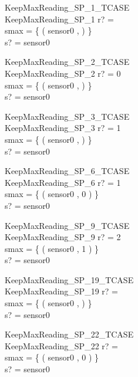 \begin{schema}{KeepMaxReading\_SP\_1\_TCASE}\\
 KeepMaxReading\_SP\_1 
\where
 r? =~ \\
 smax = \{ ( sensor0 ,  ) \} \\
 s? = sensor0
\end{schema}


\begin{schema}{KeepMaxReading\_SP\_2\_TCASE}\\
 KeepMaxReading\_SP\_2 
\where
 r? = 0 \\
 smax = \{ ( sensor0 ,  ) \} \\
 s? = sensor0
\end{schema}


\begin{schema}{KeepMaxReading\_SP\_3\_TCASE}\\
 KeepMaxReading\_SP\_3 
\where
 r? = 1 \\
 smax = \{ ( sensor0 ,  ) \} \\
 s? = sensor0
\end{schema}


\begin{schema}{KeepMaxReading\_SP\_6\_TCASE}\\
 KeepMaxReading\_SP\_6 
\where
 r? = 1 \\
 smax = \{ ( sensor0 , 0 ) \} \\
 s? = sensor0
\end{schema}


\begin{schema}{KeepMaxReading\_SP\_9\_TCASE}\\
 KeepMaxReading\_SP\_9 
\where
 r? = 2 \\
 smax = \{ ( sensor0 , 1 ) \} \\
 s? = sensor0
\end{schema}


\begin{schema}{KeepMaxReading\_SP\_19\_TCASE}\\
 KeepMaxReading\_SP\_19 
\where
 r? =~ \\
 smax = \{ ( sensor0 ,  ) \} \\
 s? = sensor0
\end{schema}


\begin{schema}{KeepMaxReading\_SP\_22\_TCASE}\\
 KeepMaxReading\_SP\_22 
\where
 r? =~ \\
 smax = \{ ( sensor0 , 0 ) \} \\
 s? = sensor0
\end{schema}


